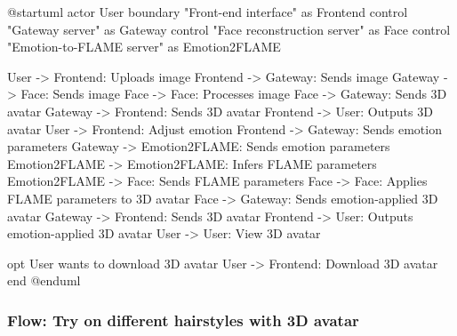 \begin{umlfigure}
    @startuml
    actor User
    boundary "Front-end interface" as Frontend
    control "Gateway server" as Gateway
    control "Face reconstruction server" as Face
    control "Emotion-to-FLAME server" as Emotion2FLAME

    User -> Frontend: Uploads image
    Frontend -> Gateway: Sends image
    Gateway -> Face: Sends image
    Face -> Face: Processes image
    Face -> Gateway: Sends 3D avatar
    Gateway -> Frontend: Sends 3D avatar
    Frontend -> User: Outputs 3D avatar
    User -> Frontend: Adjust emotion
    Frontend -> Gateway: Sends emotion parameters
    Gateway -> Emotion2FLAME: Sends emotion parameters
    Emotion2FLAME -> Emotion2FLAME: Infers FLAME parameters
    Emotion2FLAME -> Face: Sends FLAME parameters
    Face -> Face: Applies FLAME parameters to 3D avatar
    Face -> Gateway: Sends emotion-applied 3D avatar
    Gateway -> Frontend: Sends 3D avatar
    Frontend -> User: Outputs emotion-applied 3D avatar
    User -> User: View 3D avatar

    opt User wants to download 3D avatar
    User -> Frontend: Download 3D avatar
    end
    @enduml
\end{umlfigure}



\subsubsection{Flow: Try on different hairstyles with 3D avatar}




